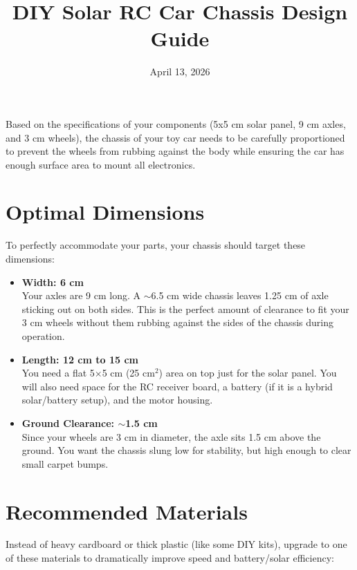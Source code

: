 \documentclass[12pt,a4paper]{article}
\title{DIY Solar RC Car Chassis Design Guide}
\author{}
\date{April 13, 2026}
\begin{document}
\maketitle

Based on the specifications of your components (5x5 cm solar panel, 9 cm axles, and 3 cm wheels), the chassis of your toy car needs to be carefully proportioned to prevent the wheels from rubbing against the body while ensuring the car has enough surface area to mount all electronics.

\section{Optimal Dimensions}

To perfectly accommodate your parts, your chassis should target these dimensions:

\begin{itemize}
    \item \textbf{Width: 6 cm} \\
    Your axles are 9 cm long. A $\sim$6.5 cm wide chassis leaves 1.25 cm of axle sticking out on both sides. This is the perfect amount of clearance to fit your 3 cm wheels without them rubbing against the sides of the chassis during operation.

    \item \textbf{Length: 12 cm to 15 cm} \\
    You need a flat 5$\times$5 cm (25 cm$^{2}$) area on top just for the solar panel. You will also need space for the RC receiver board, a battery (if it is a hybrid solar/battery setup), and the motor housing.

    \item \textbf{Ground Clearance: $\sim$1.5 cm} \\
    Since your wheels are 3 cm in diameter, the axle sits 1.5 cm above the ground. You want the chassis slung low for stability, but high enough to clear small carpet bumps.
\end{itemize}

\section{Recommended Materials}

Instead of heavy cardboard or thick plastic (like some DIY kits), upgrade to one of these materials to dramatically improve speed and battery/solar efficiency:
\end{document}
